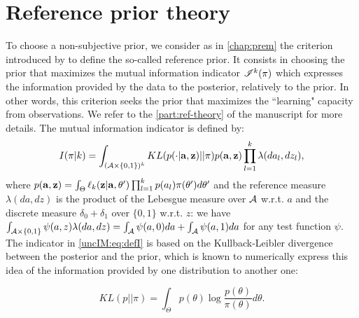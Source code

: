\section{Reference prior theory} \label{uncIM:sec:objprior}

    To choose a non-subjective prior, we consider as in \cref{chap:prem} the criterion introduced by \citet{bernardo_expected_1979} to define the so-called reference prior. It consists in choosing the prior that maximizes the mutual information indicator $\mathscr{I}^k(\pi)$ which expresses the information provided by the data to the posterior, relatively to the prior. In other words, this criterion seeks the prior that maximizes the ``learning" capacity from observations. We refer to the \cref{part:ref-theory} of the manuscript for more details. The mutual information indicator is defined by:
    \begin{equation}
        I(\pi|k)=\int_{(\mathcal{A}\times \{0,1\})^k} KL(p(\cdot|\mathbf{a},\mathbf{z})||\pi)p(\mathbf{a},\mathbf{z})\prod_{l=1}^k \lambda(da_l,dz_l),
         \label{uncIM:eq:defI}
    \end{equation}
    where $p(\mathbf{a},\mathbf{z}) = \int_{\Theta} \ell_k(\mathbf{z}|\mathbf{a},\theta' ) \prod_{l=1}^kp(a_l) \pi(\theta')d\theta'$ and the reference measure $\lambda(da,dz)$ is the product of the Lebesgue measure over $\mathcal{A}$ w.r.t. $a$ and the discrete measure $\delta_0+\delta_1$ over $\{0,1\}$ w.r.t. $z$: we have $\int_{ \mathcal{A} \times \{0,1\}} \psi(a,z)\lambda(da,dz) = \int_{\cal A} \psi(a,0) da+\int_{\cal A} \psi(a,1) da$ for any test function $\psi$.
The indicator in \cref{uncIM:eq:defI} is based on the Kullback-Leibler divergence between the posterior and the prior, which is known to numerically express this idea of the information provided by one distribution to another one: 
    
    \begin{equation}
        KL(p||\pi)=\int_{\Theta} p(\theta)\log\frac{p(\theta)}{\pi(\theta)} d \theta.
         \label{uncIM:eq:defKL}
    \end{equation}


